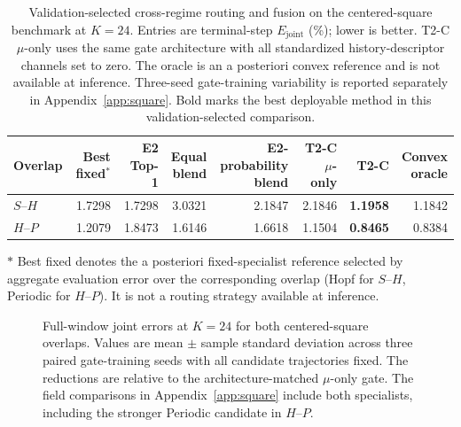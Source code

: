 \par
\begin{table}[H]
\centering
\caption{
Validation-selected cross-regime routing and fusion on the centered-square benchmark at $K=24$. Entries are terminal-step $E_{\mathrm{joint}}$ (\%); lower is better. T2-C $\mu$-only uses the same gate architecture with all standardized history-descriptor channels set to zero. The oracle is an a posteriori convex reference and is not available at inference. Three-seed gate-training variability is reported separately in
Appendix~\ref{app:square}. Bold marks the best deployable method in this validation-selected comparison.
}
\label{tab:routing_fusion}
\small
\setlength{\tabcolsep}{3.5pt}
\begin{threeparttable}
\begin{tabular}{@{}lrrrrrrr@{}}
\toprule
Overlap & Best fixed$^\ast$ & E2 Top-1 & \shortstack{Equal\\blend} & \shortstack{E2-probability\\blend} & \shortstack{T2-C\\$\mu$-only} & T2-C & \shortstack{Convex\\oracle}\\
\midrule
$S$--$H$ & 1.7298 & 1.7298 & 3.0321 & 2.1847 & 2.1846 & \textbf{1.1958} & 1.1842 \\
$H$--$P$ & 1.2079 & 1.8473 & 1.6146 & 1.6618 & 1.1504 & \textbf{0.8465} & 0.8384 \\
\bottomrule
\end{tabular}
\begin{tablenotes}[flushleft]
\footnotesize
\item[$\ast$] Best fixed denotes the a posteriori fixed-specialist reference selected by aggregate evaluation error over the corresponding overlap (Hopf for $S$--$H$, Periodic for $H$--$P$). It is not a routing strategy available at inference.
\end{tablenotes}
\end{threeparttable}
\end{table}
\par


\begin{figure}[H]
\centering

\caption{Full-window joint errors at $K=24$ for both centered-square
overlaps. Values are mean $\pm$ sample standard deviation across three
paired gate-training seeds with all candidate trajectories fixed.
The reductions are relative to the architecture-matched $\mu$-only gate.
The field comparisons in Appendix~\ref{app:square} include both
specialists, including the stronger Periodic candidate in $H$--$P$.}
\label{fig:square_overlap}
\end{figure}

